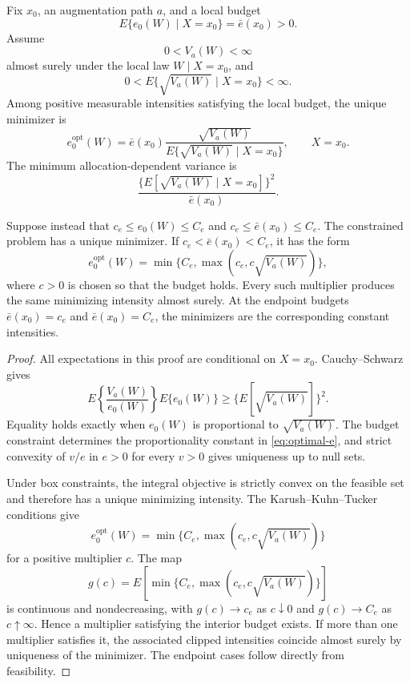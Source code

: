 \begin{proposition}
\label{prop:optimal-allocation}
Fix \(x_0\), an augmentation path \(a\), and a local budget
\[
E\{e_0(W)\mid X=x_0\}=\bar e(x_0)>0.
\]
Assume
\[
0<V_a(W)<\infty
\]
almost surely under the local law \(W\mid X=x_0\), and
\[
0<E\{\sqrt{V_a(W)}\mid X=x_0\}<\infty.
\]
Among positive measurable intensities satisfying the local budget, the unique minimizer is
\begin{equation}
e_0^{\mathrm{opt}}(W)
=
\bar e(x_0)
\frac{\sqrt{V_a(W)}}
{E\{\sqrt{V_a(W)}\mid X=x_0\}},
\qquad X=x_0.
\label{eq:optimal-e}
\end{equation}
The minimum allocation-dependent variance is
\begin{equation}
\frac{\{E[\sqrt{V_a(W)}\mid X=x_0]\}^2}{\bar e(x_0)}.
\label{eq:optimal-allocation-value}
\end{equation}

Suppose instead that \(c_e\le e_0(W)\le C_e\) and \(c_e\le\bar e(x_0)\le C_e\). The constrained problem has a unique minimizer. If \(c_e<\bar e(x_0)<C_e\), it has the form
\begin{equation}
e_0^{\mathrm{opt}}(W)
=
\min\{C_e,\max(c_e,c\sqrt{V_a(W)})\},
\label{eq:clipped-optimal-e}
\end{equation}
where \(c>0\) is chosen so that the budget holds. Every such multiplier produces the same minimizing intensity almost surely. At the endpoint budgets \(\bar e(x_0)=c_e\) and \(\bar e(x_0)=C_e\), the minimizers are the corresponding constant intensities.
\end{proposition}

\begin{proof}
All expectations in this proof are conditional on \(X=x_0\). Cauchy--Schwarz gives
\[
E\left\{\frac{V_a(W)}{e_0(W)}\right\}
E\{e_0(W)\}
\ge
\{E[\sqrt{V_a(W)}]\}^2.
\]
Equality holds exactly when \(e_0(W)\) is proportional to \(\sqrt{V_a(W)}\). The budget constraint determines the proportionality constant in \eqref{eq:optimal-e}, and strict convexity of \(v/e\) in \(e>0\) for every \(v>0\) gives uniqueness up to null sets.

Under box constraints, the integral objective is strictly convex on the feasible set and therefore has a unique minimizing intensity. The Karush--Kuhn--Tucker conditions give
\[
e_0^{\mathrm{opt}}(W)
=
\min\{C_e,\max(c_e,c\sqrt{V_a(W)})\}
\]
for a positive multiplier \(c\). The map
\[
g(c)=E[\min\{C_e,\max(c_e,c\sqrt{V_a(W)})\}]
\]
is continuous and nondecreasing, with \(g(c)\to c_e\) as \(c\downarrow0\) and \(g(c)\to C_e\) as \(c\uparrow\infty\). Hence a multiplier satisfying the interior budget exists. If more than one multiplier satisfies it, the associated clipped intensities coincide almost surely by uniqueness of the minimizer. The endpoint cases follow directly from feasibility.
\end{proof}

